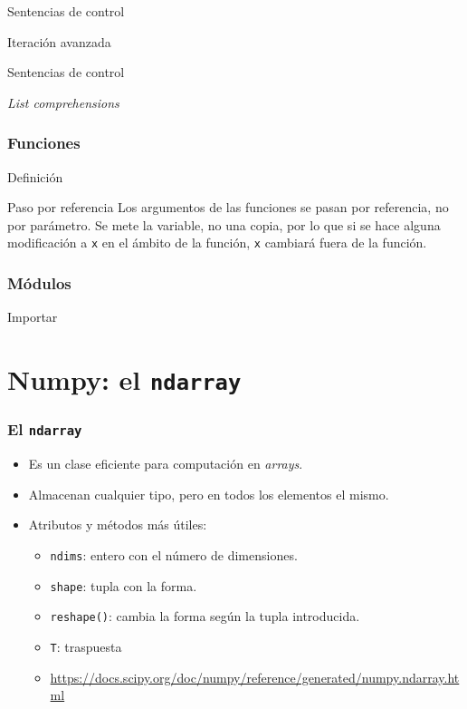 \documentclass{beamer}
\begin{document}
\begin{frame}{Sentencias de control}
	\begin{block}{Iteración avanzada}
		
	\end{block}
\end{frame}

\begin{frame}{Sentencias de control}
	\begin{block}{\textsl{List comprehensions}}
		
	\end{block}
\end{frame}

\begin{frame}\frametitle{Funciones}
	\begin{block}{Definición}
		
	\end{block}
	\begin{alertblock}{Paso por referencia}
		Los argumentos de las funciones se pasan por referencia, no por parámetro. Se mete la variable, no una copia, por lo que si se hace alguna modificación a \texttt{x} en el ámbito de la función, \texttt{x} cambiará fuera de la función.
	\end{alertblock}
\end{frame}

\begin{frame}\frametitle{Módulos}
	\begin{block}{Importar}
		
	\end{block}
\end{frame}

\section{Numpy: el \texttt{ndarray}}

\begin{frame}\frametitle{El \texttt{ndarray}}
	\begin{itemize}
		\item Es un clase eficiente para computación en \textsl{arrays}.
		\item Almacenan cualquier tipo, pero en todos los elementos el mismo.
		\item Atributos y métodos más útiles:
		\begin{itemize}
			\item \texttt{ndims}: entero con el número de dimensiones.
			\item \texttt{shape}: tupla con la forma.
			\item \texttt{reshape()}: cambia la forma según la tupla introducida.
			\item \texttt{T}: traspuesta
			\item \url{https://docs.scipy.org/doc/numpy/reference/generated/numpy.ndarray.html}
		\end{itemize}
	\end{itemize}
\end{frame}
\end{document}

